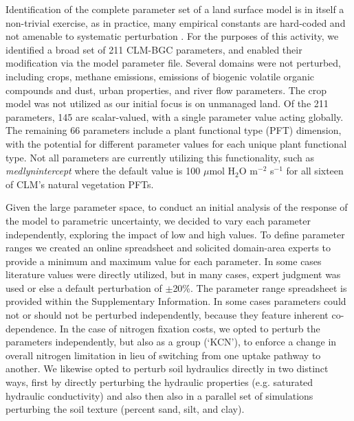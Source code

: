 \documentclass[draft]{agujournal2019}
\begin{document}
Identification of the complete parameter set of a land surface model is in itself a non-trivial exercise, as in practice, many empirical constants are hard-coded and not amenable to systematic perturbation \cite{mendoza2015,cuntz2016}. For the purposes of this activity, we identified a broad set of 211 CLM-BGC parameters, and enabled their modification via the model parameter file. Several domains were not perturbed, including crops, methane emissions, emissions of biogenic volatile organic compounds and dust, urban properties, and river flow parameters. The crop model was not utilized as our initial focus is on unmanaged land. Of the 211 parameters, 145 are scalar-valued, with a single parameter value acting globally. The remaining 66 parameters include a plant functional type (PFT) dimension, with the potential for different parameter values for each unique plant functional type. Not all parameters are currently utilizing this functionality, such as \textit{medlynintercept} where the default value is 100 $\mu$mol H$_2$O m$^{-2}$ s$^{-1}$ for all sixteen of CLM's natural vegetation PFTs.

Given the large parameter space, to conduct an initial analysis of the response of the model to parametric uncertainty, we decided to vary each parameter independently, exploring the impact of low and high values. To define parameter ranges we created an online spreadsheet and solicited domain-area experts to provide a minimum and maximum value for each parameter. In some cases literature values were directly utilized, but in many cases, expert judgment was used or else a default perturbation of $\pm$20\%. The parameter range spreadsheet is provided within the Supplementary Information. In some cases parameters could not or should not be perturbed independently, because they feature inherent co-dependence. In the case of nitrogen fixation costs, we opted to perturb the parameters independently, but also as a group (`KCN'), to enforce a change in overall nitrogen limitation in lieu of switching from one uptake pathway to another. We likewise opted to perturb soil hydraulics directly in two distinct ways, first by directly perturbing the hydraulic properties (e.g. saturated hydraulic conductivity) and also then also in a parallel set of simulations perturbing the soil texture (percent sand, silt, and clay).
\end{document}
